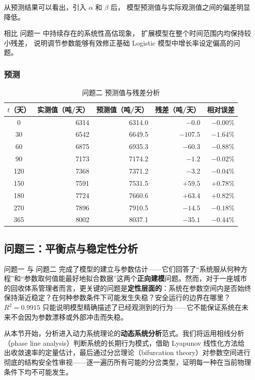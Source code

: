 \documentclass[12pt,a4paper]{ctexart}
\begin{document}
\begin{table}[htbp]
从预测结果可以看出，引入 $\alpha$ 和 $\beta$ 后，
模型预测值与实际观测值之间的偏差明显降低。

相比 问题一 中持续存在的系统性高估现象，
扩展模型在整个时间范围内均保持较小残差，
说明调节参数能够有效修正基础 Logistic 模型中增长率设定偏高的问题。

\subsubsection{预测}

\begin{table}[htbp]
\centering
\caption{问题二 预测值与残差分析}
\label{tab:q2_predictions}
\begin{tabular}{crrrr}
\toprule
$t$（天） & 实测值（吨/天） & 预测值（吨/天） & 残差（吨/天） & 相对误差 \\
\midrule
0   & 6314 & 6314.0 & $-0.0$    & $-0.00\%$ \\
30  & 6542 & 6649.5 & $-107.5$  & $-1.64\%$ \\
60  & 6875 & 6935.3 & $-60.3$   & $-0.88\%$ \\
90  & 7173 & 7174.2 & $-1.2$    & $-0.02\%$ \\
120 & 7368 & 7371.2 & $-3.2$    & $-0.04\%$ \\
150 & 7591 & 7531.5 & $+59.5$   & $+0.78\%$ \\
180 & 7724 & 7660.6 & $+63.4$   & $+0.82\%$ \\
270 & 7896 & 7910.5 & $-14.5$   & $-0.18\%$ \\
365 & 8002 & 8037.1 & $-35.1$   & $-0.44\%$ \\
\bottomrule
\end{tabular}
\end{table}

\subsection{问题三：平衡点与稳定性分析}

问题一 与 问题二 完成了模型的建立与参数估计——它们回答了``系统服从何种方程''和``参数取何值能最好地拟合数据''这两个\textbf{正向建模}问题。然而，对于一座城市的回收体系管理者而言，更关键的问题是\textbf{定性层面的}：系统在参数空间内是否始终保持渐近稳定？在何种参数条件下可能发生失稳？安全运行的边界在哪里？$R^2 = 0.9915$ 只能说明模型精确描述了已经观测到的行为——它不能保证系统在未来不会因为参数漂移或外部冲击而失稳。

从本节开始，分析进入动力系统理论的\textbf{动态系统分析}范式。我们将运用相线分析（phase line analysis）判断系统的长期行为模式，借助 Lyapunov 线性化方法给出收敛速率的定量估计，最后通过分岔理论（bifurcation theory）对参数空间进行彻底的结构安全性审视——逐一遍历所有可能的分岔类型，证明每一种在当前物理条件下均不可能发生。


\end{table}
\end{document}
